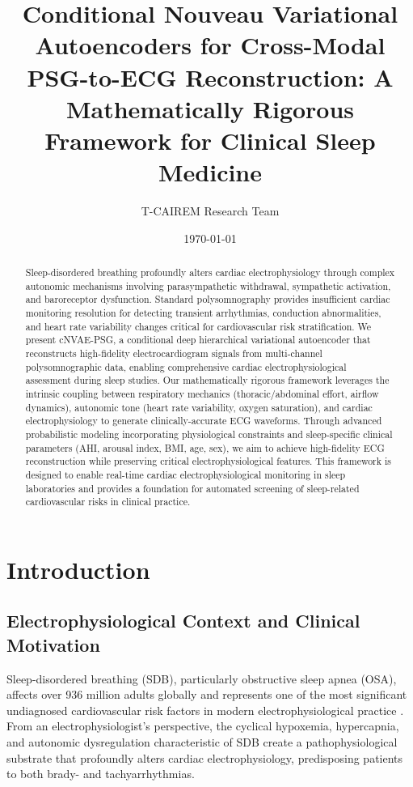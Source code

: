 \documentclass[11pt,en]{elegantpaper}
\title{Conditional Nouveau Variational Autoencoders for Cross-Modal PSG-to-ECG Reconstruction: A Mathematically Rigorous Framework for Clinical Sleep Medicine}
\author{T-CAIREM Research Team}
\institute{Sleep Research Institute, Clinical AI Research Excellence in Medicine \\ Department of Electrophysiology and Sleep Medicine}
\date{\today}
\begin{document}
\maketitle

\begin{abstract}
Sleep-disordered breathing profoundly alters cardiac electrophysiology through complex autonomic mechanisms involving parasympathetic withdrawal, sympathetic activation, and baroreceptor dysfunction. Standard polysomnography provides insufficient cardiac monitoring resolution for detecting transient arrhythmias, conduction abnormalities, and heart rate variability changes critical for cardiovascular risk stratification. We present cNVAE-PSG, a conditional deep hierarchical variational autoencoder that reconstructs high-fidelity electrocardiogram signals from multi-channel polysomnographic data, enabling comprehensive cardiac electrophysiological assessment during sleep studies. Our mathematically rigorous framework leverages the intrinsic coupling between respiratory mechanics (thoracic/abdominal effort, airflow dynamics), autonomic tone (heart rate variability, oxygen saturation), and cardiac electrophysiology to generate clinically-accurate ECG waveforms. Through advanced probabilistic modeling incorporating physiological constraints and sleep-specific clinical parameters (AHI, arousal index, BMI, age, sex), we aim to achieve high-fidelity ECG reconstruction while preserving critical electrophysiological features. This framework is designed to enable real-time cardiac electrophysiological monitoring in sleep laboratories and provides a foundation for automated screening of sleep-related cardiovascular risks in clinical practice.
\end{abstract}

\section{Introduction}

\subsection{Electrophysiological Context and Clinical Motivation}

Sleep-disordered breathing (SDB), particularly obstructive sleep apnea (OSA), affects over 936 million adults globally and represents one of the most significant undiagnosed cardiovascular risk factors in modern electrophysiological practice \cite{benjafield2019}. From an electrophysiologist's perspective, the cyclical hypoxemia, hypercapnia, and autonomic dysregulation characteristic of SDB create a pathophysiological substrate that profoundly alters cardiac electrophysiology, predisposing patients to both brady- and tachyarrhythmias.
\end{document}
